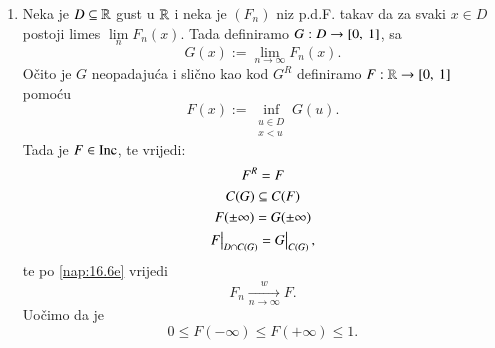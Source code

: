 \begin{nap}
\begin{enumerate}[label=(\alph*)]
        \item   \label{nap:16.6f}
        Neka je $D \subseteq \mathbb{R}$ gust u $\mathbb{R}$ i neka je $(F_n)$ niz p.d.F. takav da za svaki $x \in D$ postoji limes $\lim\limits_n F_n (x)$.
        Tada definiramo $G : D \to [{0}, \:{1}]$, sa 
        \begin{equation*}
            G(x) := \lim\limits_{n \to \infty} F_n (x).
        \end{equation*}
        O\v cito je $G$ neopadaju\' ca i sli\v cno kao kod $G^R$ definiramo $F:\mathbb{R} \to [{0}, \:{1}]$ pomo\' cu
        \begin{equation*}
            F (x) := \inf\limits_{
                \begin{smallmatrix}
                    u \in D\\
                    x < u
                \end{smallmatrix}
            } G(u).
        \end{equation*}
        Tada je $F \in \mathrm{Inc}$, te vrijedi:
        \begin{equation*}
            \begin{gathered}
                F^R = F\\
                C(G) \subseteq C(F)\\
                F(\pm \infty) = G(\pm \infty)\\
                \restr{F}{D \cap C(G)} = \restr{G}{C(G)},
            \end{gathered}
        \end{equation*}
        te po \ref{nap:16.6e} vrijedi
        \begin{equation*}
            F_n \xrightarrow[n \to \infty]{w} F.
        \end{equation*}
        Uo\v cimo da je
        \begin{equation*}
            0 \leq F(-\infty) \leq F(+\infty) \leq 1.
        \end{equation*}
    \end{enumerate}
\end{nap}

